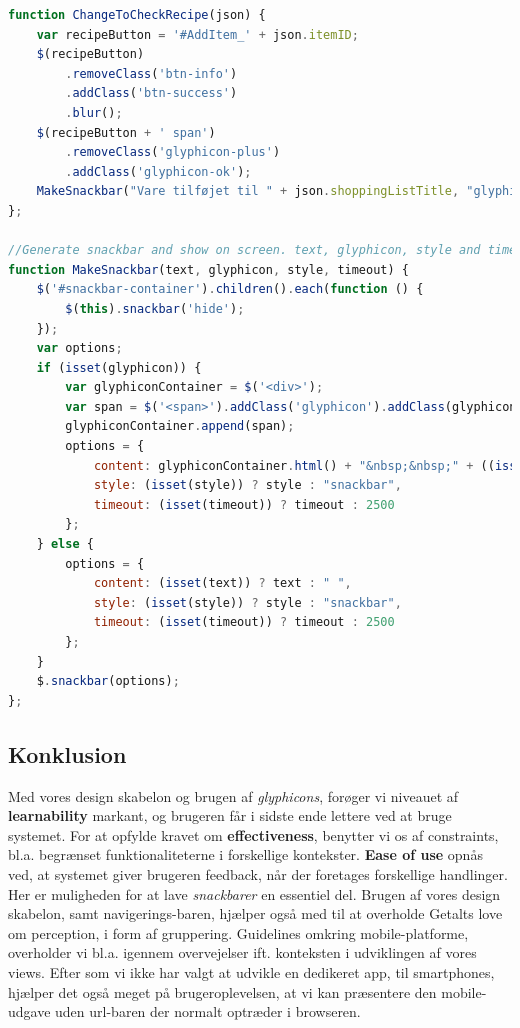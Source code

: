 \begin{lstlisting}[language=JavaScript,caption={Javascript funktioner, der giver bruger feedback},label=code:user_feedback]
function ChangeToCheckRecipe(json) {
    var recipeButton = '#AddItem_' + json.itemID;
    $(recipeButton)
        .removeClass('btn-info')
        .addClass('btn-success')
        .blur();
    $(recipeButton + ' span')
        .removeClass('glyphicon-plus')
        .addClass('glyphicon-ok');
    MakeSnackbar("Vare tilføjet til " + json.shoppingListTitle, "glyphicon-ok", "toast", "1500");
};

//Generate snackbar and show on screen. text, glyphicon, style and timeout is optional.
function MakeSnackbar(text, glyphicon, style, timeout) {
    $('#snackbar-container').children().each(function () {
        $(this).snackbar('hide');
    });
    var options;
    if (isset(glyphicon)) {
        var glyphiconContainer = $('<div>');
        var span = $('<span>').addClass('glyphicon').addClass(glyphicon);
        glyphiconContainer.append(span);
        options = {
            content: glyphiconContainer.html() + "&nbsp;&nbsp;" + ((isset(text)) ? text : " "),
            style: (isset(style)) ? style : "snackbar",
            timeout: (isset(timeout)) ? timeout : 2500
        };
    } else {
        options = {
            content: (isset(text)) ? text : " ",
            style: (isset(style)) ? style : "snackbar",
            timeout: (isset(timeout)) ? timeout : 2500
        };
    }
    $.snackbar(options);
};
\end{lstlisting}

\subsection{Konklusion}
Med vores design skabelon og brugen af \textit{glyphicons}, forøger vi niveauet af \textbf{learnability} markant, og brugeren får i sidste ende lettere ved at bruge systemet.
For at opfylde kravet om \textbf{effectiveness}, benytter vi os af constraints, bl.a. begrænset funktionaliteterne i forskellige kontekster.
\textbf{Ease of use} opnås ved, at systemet giver brugeren feedback, når der foretages forskellige handlinger.
Her er muligheden for at lave \textit{snackbarer} en essentiel del.
Brugen af vores design skabelon, samt navigerings-baren, hjælper også med til at overholde Getalts love om perception, i form af gruppering.
Guidelines omkring mobile-platforme, overholder vi bl.a. igennem overvejelser ift. konteksten i udviklingen af vores views.
Efter som vi ikke har valgt at udvikle en dedikeret app, til smartphones, hjælper det også meget på brugeroplevelsen, at vi kan præsentere den mobile-udgave uden url-baren der normalt optræder i browseren.